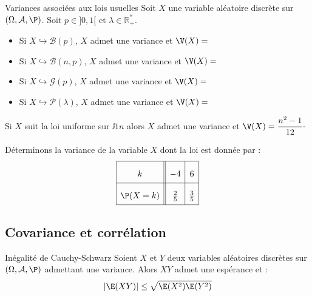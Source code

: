 \documentclass[french,11pt,twoside]{VcCours}
\begin{document}
\begin{Theoreme}{Variances associées aux lois usuelles}
Soit $X$ une variable aléatoire discrète sur $(\Omega, \mathcal{A}, \P)$. Soit $p \in ]0,1[$ et $\lambda \in \mathbb{R}_+^{*}$.

\begin{itemize}
\item Si $X \hookrightarrow \mathcal{B}(p)$, $X$ admet une variance et $\V(X)=$
\item Si $X \hookrightarrow \mathcal{B}(n,p)$, $X$ admet une variance et $\V(X)=$
\item Si $X \hookrightarrow \mathcal{G}(p)$, $X$ admet une variance et $\V(X)= $
\item Si $X \hookrightarrow \mathcal{P}(\lambda)$, $X$ admet une variance et $\V(X)= $
\end{itemize}
\end{Theoreme}

\begin{Demonstration}{}

\vspace{15cm}
\end{Demonstration}

\begin{Remarque}{} Si $X$ suit la loi uniforme sur $\ii{1}{n}$ alors $X$ admet une variance et $\V(X) = \dfrac{n^2-1}{12} \cdot$
\end{Remarque} 

\begin{Exemple}{} Déterminons la variance de la variable $X$ dont la loi est donnée par :
$$\renewcommand{\arraystretch}{2.1}\begin{array}{|c||c|c|}
\hline
k & -4 & 6\\
\hline
\P(X=k) & \frac 2 5 & \frac 3 5\\
\hline
\end{array}$$

\vspace{4cm}
\end{Exemple}

\subsection{Covariance et corrélation}

\begin{Proposition}{Inégalité de Cauchy-Schwarz}
Soient $X$ et $Y$ deux variables aléatoires discrètes sur $(\Omega, \mathcal{A}, \P)$ admettant une variance. Alors $XY$ admet une espérance et :
$$ \vert \E(XY) \vert \leq \sqrt{\E(X^2)\E(Y^2)}$$
\end{Proposition}
\end{document}
